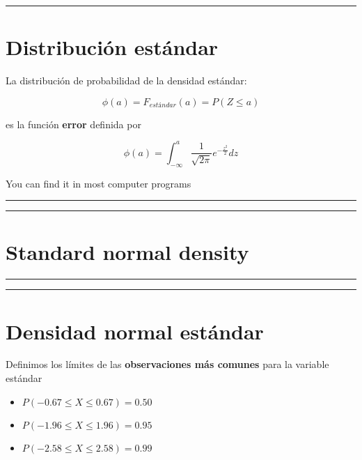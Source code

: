 \documentclass[
]{book}
\providecommand{\tightlist}{%
  \setlength{\itemsep}{0pt}\setlength{\parskip}{0pt}}
\begin{document}
\begin{center}\rule{0.5\linewidth}{0.5pt}\end{center}

\hypertarget{distribuciuxf3n-estuxe1ndar}{%
\section{Distribución estándar}\label{distribuciuxf3n-estuxe1ndar}}

La distribución de probabilidad de la densidad estándar:

\[\phi(a)=F_{estándar}(a)=P(Z \leq a)\]

es la función \textbf{error} definida por

\[\phi(a)=\int_{-\infty}^{a} \frac{1}{\sqrt{2\pi}}e^{-\frac{z^2}{2}} dz\]

You can find it in most computer programs

\begin{center}\rule{0.5\linewidth}{0.5pt}\end{center}

\begin{center}\rule{0.5\linewidth}{0.5pt}\end{center}

\hypertarget{standard-normal-density}{%
\section{Standard normal density}\label{standard-normal-density}}

\begin{center}\rule{0.5\linewidth}{0.5pt}\end{center}

\begin{center}\rule{0.5\linewidth}{0.5pt}\end{center}

\hypertarget{densidad-normal-estuxe1ndar-3}{%
\section{Densidad normal estándar}\label{densidad-normal-estuxe1ndar-3}}

Definimos los límites de las \textbf{observaciones más comunes} para la variable estándar

\begin{itemize}
\tightlist
\item
  \(P(-0.67 \leq X \leq 0.67)=0.50\)
\item
  \(P(-1.96 \leq X \leq 1.96)=0.95\)
\item
  \(P(-2.58 \leq X \leq 2.58)=0.99\)
\end{itemize}
\end{document}
